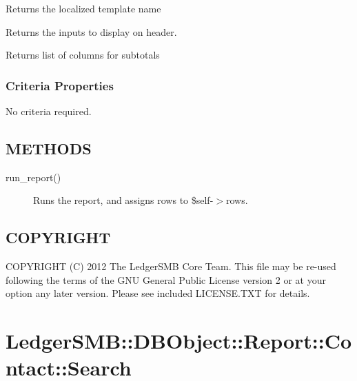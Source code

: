 \begin{description}
\begin{description}
\begin{description}
\begin{description}
\begin{description}
\begin{description}
\begin{description}
\begin{description}
\begin{description}
\begin{description}
\begin{description}
\begin{description}
\end{description}

\item[{name}] \mbox{}

Returns the localized template name


\item[{header\_lines}] \mbox{}

Returns the inputs to display on header.


\item[{subtotal\_cols}] \mbox{}

Returns list of columns for subtotals

\end{description}
\subsubsection*{Criteria Properties\label{LedgerSMB::DBObject::Report::COA_Criteria_Properties}}


No criteria required.

\subsection*{METHODS\label{LedgerSMB::DBObject::Report::COA_METHODS}}
\begin{description}

\item[{run\_report()}] \mbox{}

Runs the report, and assigns rows to \$self-$>$rows.

\end{description}
\subsection*{COPYRIGHT\label{LedgerSMB::DBObject::Report::COA_COPYRIGHT}}


COPYRIGHT (C) 2012 The LedgerSMB Core Team.  This file may be re-used following
the terms of the GNU General Public License version 2 or at your option any
later version.  Please see included LICENSE.TXT for details.

\section{LedgerSMB::DBObject::Report::Contact::Search\label{LedgerSMB::DBObject::Report::Contact::Search}}



\end{description}
\end{description}
\end{description}
\end{description}
\end{description}
\end{description}
\end{description}
\end{description}
\end{description}
\end{description}
